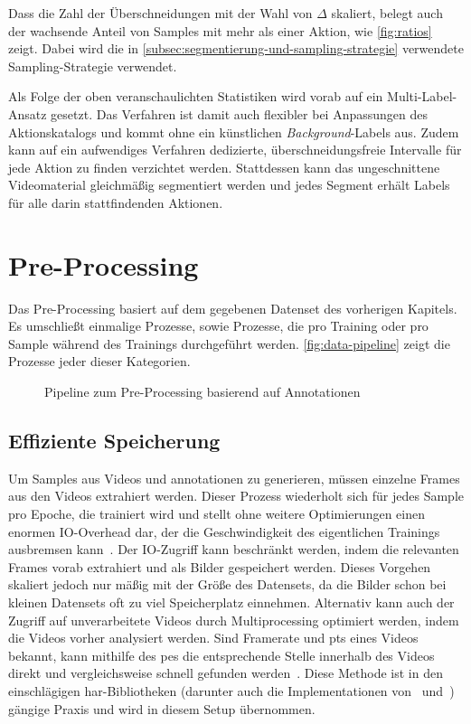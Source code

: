 Dass die Zahl der Überschneidungen mit der Wahl von $\Delta$ skaliert, belegt auch der wachsende Anteil von Samples mit mehr als einer Aktion, wie \autoref{fig:ratios} zeigt.
Dabei wird die in \autoref{subsec:segmentierung-und-sampling-strategie} verwendete Sampling-Strategie verwendet.

Als Folge der oben veranschaulichten Statistiken wird vorab auf ein Multi-Label-Ansatz gesetzt.
Das Verfahren ist damit auch flexibler bei Anpassungen des Aktionskatalogs und kommt ohne ein künstlichen \emph{Background}-Labels aus.
Zudem kann auf ein aufwendiges Verfahren dedizierte, überschneidungsfreie Intervalle für jede Aktion zu finden verzichtet werden.
Stattdessen kann das ungeschnittene Videomaterial gleichmäßig segmentiert werden und jedes Segment erhält Labels für alle darin stattfindenden Aktionen.


\section{Pre-Processing}
\label{sec:pre-processing}

Das Pre-Processing basiert auf dem gegebenen Datenset des vorherigen Kapitels.
Es umschließt einmalige Prozesse, sowie Prozesse, die pro Training oder pro Sample während des Trainings durchgeführt werden.
\autoref{fig:data-pipeline} zeigt die Prozesse jeder dieser Kategorien.

\begin{figure}
    \centering
    \caption{Pipeline zum Pre-Processing basierend auf Annotationen}
    \label{fig:data-pipeline}
\end{figure}

\subsection{Effiziente Speicherung}
\label{subsec:effiziente-speicherung}

Um Samples aus Videos und \gls{annotationen} zu generieren, müssen einzelne Frames aus den Videos extrahiert werden.
Dieser Prozess wiederholt sich für jedes Sample pro Epoche, die trainiert wird und stellt ohne weitere Optimierungen einen enormen IO-Overhead dar, der die Geschwindigkeit des eigentlichen Trainings ausbremsen kann~\cite{Wu20}.
Der IO-Zugriff kann \zB beschränkt werden, indem die relevanten Frames vorab extrahiert und als Bilder gespeichert werden.
Dieses Vorgehen skaliert jedoch nur mäßig mit der Größe des Datensets, da die Bilder schon bei kleinen Datensets oft zu viel Speicherplatz einnehmen.
Alternativ kann auch der Zugriff auf unverarbeitete Videos durch Multiprocessing optimiert werden, indem die Videos vorher analysiert werden.
Sind Framerate und \gls{pts} eines Videos bekannt, kann mithilfe des \gls{pes} die entsprechende Stelle innerhalb des Videos direkt und vergleichsweise schnell gefunden werden~\cite{Fischer10}.
Diese Methode ist in den einschlägigen \gls{har}-Bibliotheken (darunter auch die Implementationen von~\cite{Feichtenhofer18} und~\cite{Wang19}) gängige Praxis und wird in diesem Setup übernommen.


